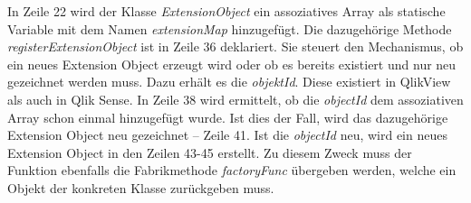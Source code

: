 In Zeile 22 wird der Klasse \textit{ExtensionObject} ein assoziatives Array als statische Variable mit dem Namen \textit{extensionMap} hinzugefügt. Die dazugehörige Methode \textit{registerExtensionObject} ist in Zeile 36 deklariert. Sie steuert den Mechanismus, ob ein neues Extension Object erzeugt wird oder ob es bereits existiert und nur neu gezeichnet werden muss. Dazu erhält es die \textit{objektId}. Diese existiert in QlikView als auch in Qlik Sense. In Zeile 38 wird ermittelt, ob die \textit{objectId} dem assoziativen Array schon einmal hinzugefügt wurde. Ist dies der Fall, wird das dazugehörige Extension Object neu gezeichnet – Zeile 41. Ist die \textit{objectId} neu, wird ein neues Extension Object in den Zeilen 43-45 erstellt. Zu diesem Zweck muss der Funktion ebenfalls die Fabrikmethode \textit{factoryFunc} übergeben werden, welche ein Objekt der konkreten Klasse zurückgeben muss.

